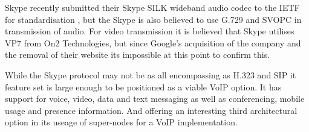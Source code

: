 Skype recently submitted their Skype SILK wideband audio codec to the IETF for standardisation \cite{website:IETFSILK10}, but the Skype is also believed to use G.729 and SVOPC in transmission of audio. For video transmission it is believed that Skype utilises VP7 from On2 Technologies, but since Google’s acquisition of the company and the removal of their website its impossible at this point to confirm this.

While the Skype protocol may not be as all encompassing as H.323 and SIP it feature set is large enough to be positioned as a viable VoIP option. It has support for voice, video, data and text messaging as well as conferencing, mobile usage and presence information. And offering an interesting third architectural option in its useage of super-nodes for a VoIP implementation.

